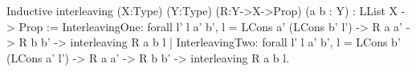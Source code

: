 Inductive interleaving (X:Type) (Y:Type) (R:Y->X->Prop) 
                       (a b : Y) : LList X -> Prop :=
   InterleavingOne: forall l' l a' b', 
                           l = LCons a' (LCons b' l') ->
                           R a a' ->
                           R b b' ->
                           interleaving R a b l
 | InterleavingTwo: forall l' l a' b', 
                           l = LCons b' (LCons a' l') ->
                           R a a' ->
                           R b b' ->
                           interleaving R a b l.